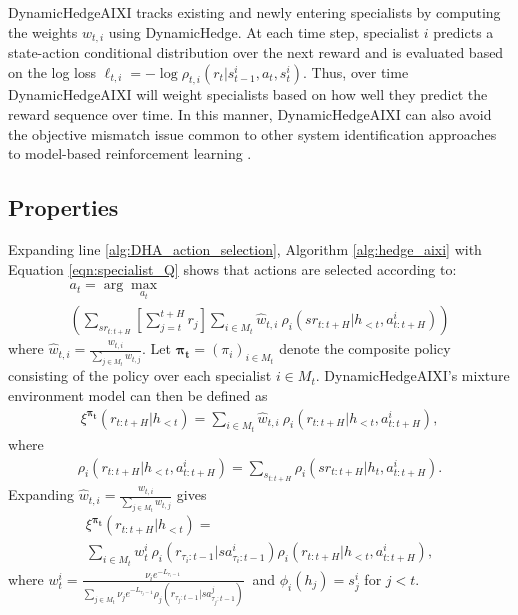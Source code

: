 \documentclass[letterpaper]{article} %
\theoremstyle{definition}
\begin{document}
DynamicHedgeAIXI tracks existing and newly entering specialists by computing the weights $w_{t, i}$ using DynamicHedge.
At each time step, specialist $i$ predicts a state-action conditional distribution over the next reward and is evaluated based on the log loss $\ell_{t, i} = - \log \rho_{t, i}(r_t | s_{t-1}^{i}, a_t, s_{t}^{i})$. Thus, over time DynamicHedgeAIXI will weight specialists based on how well they predict the reward sequence over time. 
In this manner, DynamicHedgeAIXI can also avoid the objective mismatch issue common to other system identification approaches to model-based reinforcement learning \cite{lambert2021obj_mismatch,eysenbach2023obj_mismatch}.


\subsection{Properties}
Expanding line \ref{alg:DHA_action_selection}, Algorithm \ref{alg:hedge_aixi} with Equation \ref{eqn:specialist_Q} shows that actions are selected according to:
\begin{multline}
    a_t = \arg\max_{a_t} \\
    \left(\sum_{sr_{t:t+H}} \left[ \sum_{j=t}^{t+H} r_j \right] \sum_{i \in M_t} \hat{w}_{t, i} ~ \rho_i(sr_{t:t+H} | h_{<t}, a^{i}_{t:t+H})\right) \label{eqn:DHA_mix}
\end{multline}
where $\hat{w}_{t, i} = \frac{ w_{t, i} }{ \sum_{j \in M_t} w_{t, j} }$.
Let $\bm{\pi_t} = (\pi_i)_{i \in M_t}$ denote the composite policy consisting of the policy over each specialist $i \in M_t$. 
DynamicHedgeAIXI's mixture environment model can then be defined as 
\begin{align*}
    \xi^{\bm{\pi_t}}(r_{t:t+H} | h_{<t}) = \sum_{i \in M_t} \hat{w}_{t, i} ~ \rho_i(r_{t:t+H} | h_{<t}, a^{i}_{t:t+H}),
\end{align*}
where 
\begin{equation*}
    \begin{split}
    \rho_i(r_{t:t+H} | h_{<t}, a^{i}_{t:t+H}) = \sum_{s_{t:t+H}} \rho_i(sr_{t:t+H} | h_{t}, a^{i}_{t:t+H}).
    \end{split}
\end{equation*}
Expanding $\hat{w}_{t, i} = \frac{w_{t, i}}{\sum_{j \in M_t} w_{t, j}}$ gives
\begin{multline}
    \xi^{\bm{\pi_t}}(r_{t:t+H} | h_{<t}) = \\
    \sum_{i \in M_t} w_{t}^{i} ~ \rho_{i}(r_{\tau_i:t-1} | sa^{i}_{\tau_i:t-1}) \rho_i(r_{t:t+H} | h_{<t}, a^{i}_{t:t+H}), \label{eqn:DHA_mix_reveal}
\end{multline}
where $w_{t}^{i} = \frac{\nu_i e^{-L_{\tau_i - 1}}}{ \sum_{j \in M_t} \nu_j e^{-L_{\tau_j-1}} \rho_{j}(r_{\tau_j:t-1} | sa^{j}_{\tau_j:t-1}) }~$ and $\phi_i(h_{j}) = s^{i}_{j}$ for $j < t$. 
\end{document}
